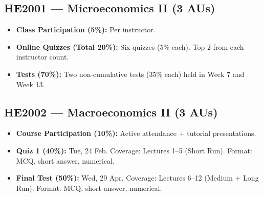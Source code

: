 \documentclass[a4paper,11pt]{article}
\begin{document}
\subsection*{HE2001 — Microeconomics II (3 AUs)}
\begin{itemize}
    \item \textbf{Class Participation (5\%):} Per instructor.
    \item \textbf{Online Quizzes (Total 20\%):} Six quizzes (5\% each). Top 2 from each instructor count.
    \item \textbf{Tests (70\%):} Two non-cumulative tests (35\% each) held in Week 7 and Week 13.
\end{itemize}

\subsection*{HE2002 — Macroeconomics II (3 AUs)}
\begin{itemize}
    \item \textbf{Course Participation (10\%):} Active attendance + tutorial presentations.
    \item \textbf{Quiz 1 (40\%):} Tue, 24 Feb. Coverage: Lectures 1--5 (Short Run). Format: MCQ, short answer, numerical.
    \item \textbf{Final Test (50\%):} Wed, 29 Apr. Coverage: Lectures 6--12 (Medium + Long Run). Format: MCQ, short answer, numerical.
\end{itemize}
\end{document}

